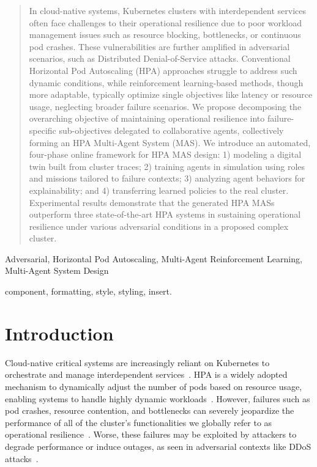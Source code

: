 \documentclass[conference]{IEEEtran}
\begin{document}
\maketitle

\begin{abstract}
    In cloud-native systems, Kubernetes clusters with interdependent services often face challenges to their operational resilience due to poor workload management issues such as resource blocking, bottlenecks, or continuous pod crashes. These vulnerabilities are further amplified in adversarial scenarios, such as Distributed Denial-of-Service attacks. Conventional Horizontal Pod Autoscaling (HPA) approaches struggle to address such dynamic conditions, while reinforcement learning-based methods, though more adaptable, typically optimize single objectives like latency or resource usage, neglecting broader failure scenarios.
    We propose decomposing the overarching objective of maintaining operational resilience into failure-specific sub-objectives delegated to collaborative agents, collectively forming an HPA Multi-Agent System (MAS). We introduce an automated, four-phase online framework for HPA MAS design: 1) modeling a digital twin built from cluster traces; 2) training agents in simulation using roles and missions tailored to failure contexts; 3) analyzing agent behaviors for explainability; and 4) transferring learned policies to the real cluster.
    Experimental results demonstrate that the generated HPA MASs outperform three state-of-the-art HPA systems in sustaining operational resilience under various adversarial conditions in a proposed complex cluster.
\end{abstract}

\begin{IEEEkeywords}
    Adversarial, Horizontal Pod Autoscaling, Multi-Agent Reinforcement Learning, Multi-Agent System Design
\end{IEEEkeywords}
component, formatting, style, styling, insert.

\section{Introduction}
\label{sec:introduction}

Cloud-native critical systems are increasingly reliant on Kubernetes to orchestrate and manage interdependent services~\cite{Pahl2019}. HPA is a widely adopted mechanism to dynamically adjust the number of pods based on resource usage, enabling systems to handle highly dynamic workloads~\cite{Toka2020}. However, failures such as pod crashes, resource contention, and bottlenecks can severely jeopardize the performance of all of the cluster's functionalities we globally refer to as operational resilience~\cite{burns2016borg}. Worse, these failures may be exploited by attackers to degrade performance or induce outages, as seen in adversarial contexts like DDoS attacks~\cite{David2021}.
\end{document}
